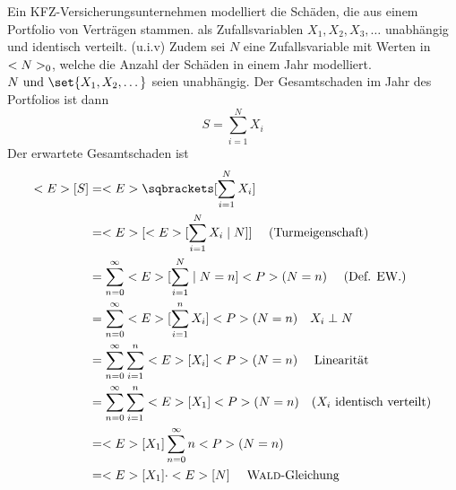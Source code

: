 \begin{example}
	Ein KFZ-Versicherungsunternehmen modelliert die Schäden, die aus einem Portfolio von Verträgen stammen. als Zufallsvariablen $X_1,X_2,X_3,\dots$ unabhängig und identisch verteilt. (u.i.v) Zudem sei $N$ eine Zufallsvariable mit Werten in $<N>_0$, welche die Anzahl der Schäden in einem Jahr modelliert. $N \und \set{X_1, X_2, \dots}$ seien unabhängig. Der Gesamtschaden im Jahr des Portfolios ist dann
	\[
		S = \sum_{i=1}^N X_i
	\]
	Der erwartete Gesamtschaden ist
	\begin{align*} %
		\E[S] &= \E\sqbrackets[\sum_{i=1}^N X_i]\\
		&=\E[\E[\sum_{i=1}^N X_i \mid N]] \quad \text{ (Turmeigenschaft)}\\
		&= \sum_{n=0}^{\infty} \E[\sum_{i=1}^N \mid N = n]\P(N=n) \quad\text{ (Def. EW.)}\\
		&= \sum_{n=0}^{\infty} \E[\sum_{i=1}^n X_i]\P(N=n) \quad X_i \perp N\\
		&= \sum_{n=0}^{\infty}\sum_{i=1}^n \E[X_i]\P(N=n) \quad \text{ Linearität}\\
		&= \sum_{n=0}^{\infty}\sum_{i=1}^n \E[X_1]\P(N=n) \quad \text{($X_i$ identisch verteilt)}\\
		&= \E[X_1] \sum_{n=0}^{\infty} n \P(N=n)\\
		&= \E[X_1]\cdot \E[N] \quad \text{ \person{Wald}-Gleichung}
	\end{align*}
\end{example}
